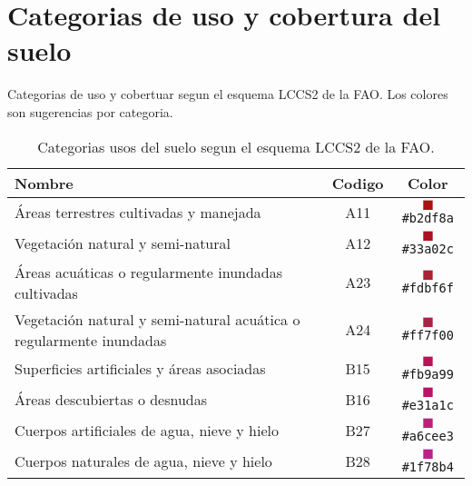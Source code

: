 \chapter{Categorias de uso y cobertura del suelo}\label{apcate}
Categorias de uso y cobertuar segun el esquema LCCS2 de la FAO\@. Los colores son
sugerencias por categoria.
\begin{table}[hbt]
    \centering
    \begin{tabular}{p{11cm}cc}
        \toprule
        Nombre & Codigo & Color \\
        \midrule
        Áreas terrestres cultivadas y manejada & A11 & \textcolor{A11}{$\blacksquare$}\texttt{\#b2df8a}
        \\
        Vegetación natural y semi-natural & A12 & \textcolor{A12}{$\blacksquare$}\texttt{\#33a02c}\\
        Áreas acuáticas o regularmente inundadas cultivadas & A23  &
        \textcolor{A23}{$\blacksquare$}\texttt{\#fdbf6f}\\
        Vegetación natural y semi-natural acuática o
	regularmente inundadas & A24 & \textcolor{A24}{$\blacksquare$}\texttt{\#ff7f00}\\
        Superficies artificiales y áreas asociadas & B15  &
        \textcolor{B15}{$\blacksquare$}\texttt{\#fb9a99}\\
        Áreas descubiertas o desnudas & B16 & \textcolor{B16}{$\blacksquare$}\texttt{\#e31a1c}\\
        Cuerpos artificiales de agua, nieve y hielo & B27 &
        \textcolor{B27}{$\blacksquare$}\texttt{\#a6cee3}\\
        Cuerpos naturales de agua, nieve y hielo & B28&
        \textcolor{B28}{$\blacksquare$}\texttt{\#1f78b4}\\
        \bottomrule
    \end{tabular}
\caption{\label{tabla1}Categorias usos del suelo segun el esquema LCCS2 de la
FAO.}
\end{table}
